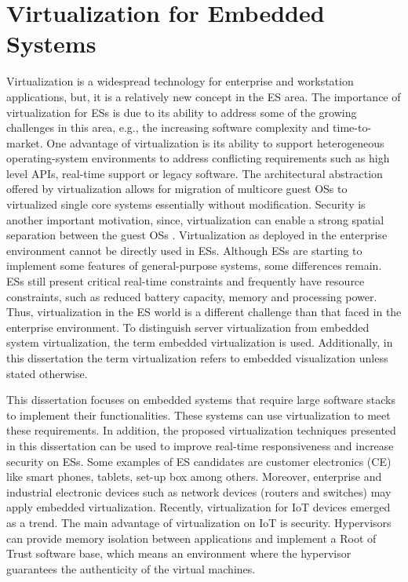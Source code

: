 \section{Virtualization for Embedded Systems}
\label{section:ev}

Virtualization is a widespread technology for enterprise and workstation applications, but, it is a relatively new concept in the ES area. The importance of virtualization for ESs is due to its ability to address some of the growing challenges in this area, e.g., the increasing software complexity and time-to-market. One advantage of virtualization is its ability to support heterogeneous operating-system environments to address conflicting requirements such as high level APIs, real-time support or legacy software. The architectural abstraction offered by virtualization allows for migration of multicore guest OSs to virtualized single core systems essentially without modification. Security is another important motivation, since, virtualization can enable a strong spatial separation between the guest OSs \cite{HeiserRole}. 
Virtualization as deployed in the enterprise environment cannot be directly used in ESs. Although ESs are starting to implement some features of general-purpose systems, some differences remain. ESs still present critical real-time constraints and frequently have resource constraints, such as reduced battery capacity, memory and processing power. Thus, virtualization in the ES world is a different challenge than that faced in the enterprise environment. To distinguish server virtualization from embedded system virtualization, the term embedded virtualization is used. Additionally, in this dissertation the term virtualization refers to embedded visualization unless stated otherwise.

This dissertation focuses on embedded systems that require large software stacks to implement their functionalities. These systems can use virtualization to meet these requirements. In addition, the proposed virtualization techniques presented in this dissertation can be used to improve real-time responsiveness and increase security on ESs. Some examples of ES candidates are customer electronics (CE) like smart phones, tablets, set-up box among others. Moreover, enterprise and industrial electronic devices such as network devices (routers and switches) may apply embedded virtualization. Recently, virtualization for IoT devices emerged as a trend. The main advantage of virtualization on IoT is security. Hypervisors can provide memory isolation between applications and implement a Root of Trust software base, which means an environment where the hypervisor guarantees the authenticity of the virtual machines. 

